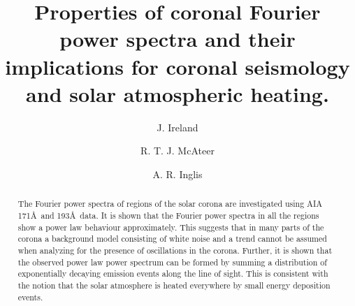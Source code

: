 \documentclass[preprint2]{aastex}
\begin{document}

\title{Properties of coronal Fourier power spectra and their
  implications for coronal seismology and solar atmospheric heating.}


\author{J. Ireland}

\author{R. T. J. McAteer}

\author{A. R. Inglis}


\begin{abstract}
The Fourier power spectra of regions of the solar corona are
investigated using AIA 171\AA\ and 193\AA\ data.  It is shown that the
Fourier power spectra in all the regions show a power law behaviour
approximately.  This suggests that in many parts of the corona a
background model consisting of white noise and a trend cannot be
assumed when analyzing for the presence of oscillations in the corona.
Further, it is shown that the observed power law power spectrum can be
formed by summing a distribution of exponentially decaying emission
events along the line of sight.  This is consistent with the notion
that the solar atmosphere is heated everywhere by small energy
deposition events.
\end{abstract}

\end{document}
